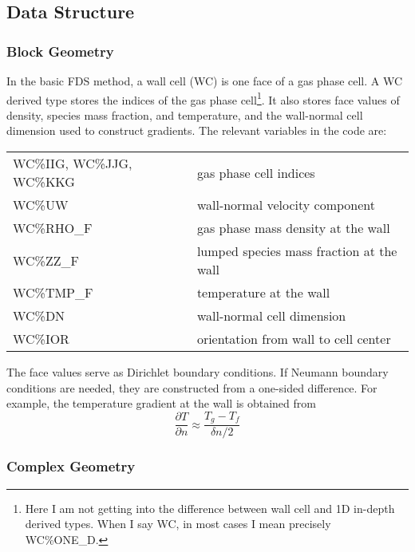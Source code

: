 \documentclass[12pt]{article}
\begin{document}
\subsection{Data Structure}

\subsubsection{Block Geometry}

In the basic FDS method, a wall cell (WC) is one face of a gas phase cell.  A WC derived type stores the indices of the gas phase cell\footnote{Here I am not getting into the difference between wall cell and 1D in-depth derived types.  When I say WC, in most cases I mean precisely {\ct WC\%ONE\_D}.}.  It also stores face values of density, species mass fraction, and temperature, and the wall-normal cell dimension used to construct gradients.  The relevant variables in the code are:

\begin{table}[h!]
\begin{tabular}{ll}
{\ct WC\%IIG, WC\%JJG, WC\%KKG} & gas phase cell indices \\
{\ct WC\%UW}                    & wall-normal velocity component \\
{\ct WC\%RHO\_F}                & gas phase mass density at the wall \\
{\ct WC\%ZZ\_F}                 & lumped species mass fraction at the wall \\
{\ct WC\%TMP\_F}                & temperature at the wall \\
{\ct WC\%DN}                    & wall-normal cell dimension \\
{\ct WC\%IOR}                   & orientation from wall to cell center
\end{tabular}
\end{table}

The face values serve as Dirichlet boundary conditions.  If Neumann boundary conditions are needed, they are constructed from a one-sided difference.  For example, the temperature gradient at the wall is obtained from
\begin{equation}
\frac{\partial T}{\partial n} \approx \frac{T_g - T_f}{\delta n/2}
\end{equation}

\subsubsection{Complex Geometry}
\end{document}
